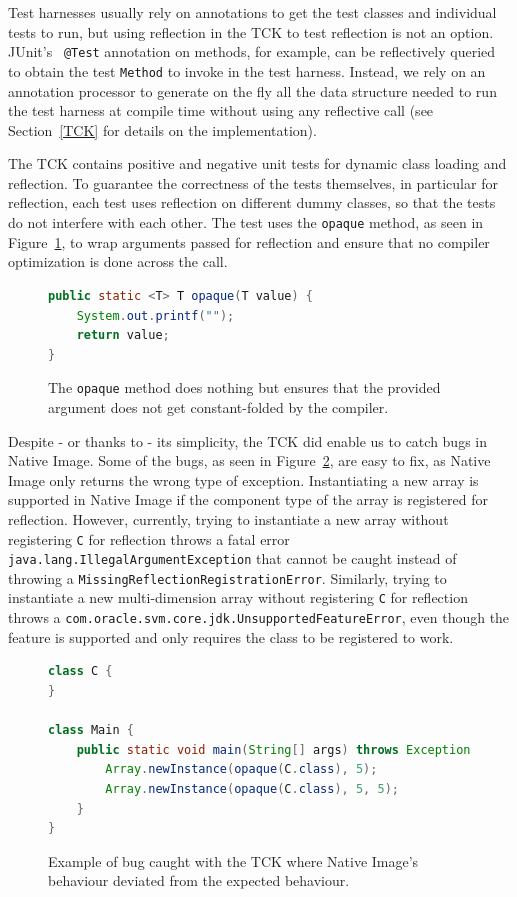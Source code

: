 Test harnesses usually rely on annotations to get the test classes and individual tests to run, but using reflection in the TCK to test reflection is not an option. JUnit's~\cite{noauthor_junit_nodate} \verb|@Test| annotation on methods, for example, can be reflectively queried to obtain the test \verb|Method| to invoke in the test harness. Instead, we rely on an annotation processor to generate on the fly all the data structure needed to run the test harness at compile time without using any reflective call (see Section~\ref{TCK} for details on the implementation).

The TCK contains positive and negative unit tests for dynamic class loading and reflection. To guarantee the correctness of the tests themselves, in particular for reflection, each test uses reflection on different dummy classes, so that the tests do not interfere with each other.
The test uses the \verb|opaque| method, as seen in Figure~\ref{fig:opaque}, to wrap arguments passed for reflection and ensure that no compiler optimization is done across the call.

\begin{figure}[ht]
    \centering
\begin{lstlisting}[language=Java]
public static <T> T opaque(T value) {
    System.out.printf("");
    return value;
}
\end{lstlisting}
    \caption{The \texttt{opaque} method does nothing but ensures that the provided argument does not get constant-folded by the compiler.}
    \label{fig:opaque}
\end{figure}

Despite - or thanks to - its simplicity, the TCK did enable us to catch bugs in Native Image. Some of the bugs, as seen in Figure~\ref{fig:new_multi_array_bug}, are easy to fix, as Native Image only returns the wrong type of exception.  
Instantiating a new array is supported in Native Image if the component type of the array is registered for reflection. However, currently, trying to instantiate a new array without registering \texttt{C} for reflection throws a fatal error \texttt{java.lang.IllegalArgumentException} that cannot be caught instead of throwing a \verb|MissingReflectionRegistrationError|. Similarly, trying to instantiate a new multi-dimension array without registering \texttt{C} for reflection throws a \texttt{com.oracle.svm.core.jdk.UnsupportedFeatureError}, even though the feature is supported and only requires the class to be registered to work.

\begin{figure}[ht]
    \centering
\begin{lstlisting}[language=Java]
class C {
}

class Main {
    public static void main(String[] args) throws Exception {
        Array.newInstance(opaque(C.class), 5);
        Array.newInstance(opaque(C.class), 5, 5);
    }
}
\end{lstlisting}
    \caption{Example of bug caught with the TCK where Native Image's behaviour deviated from the expected behaviour.}
    \label{fig:new_multi_array_bug}
\end{figure}

